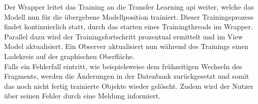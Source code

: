 \documentclass[oneside]{ausarbeitung}
\begin{document}
Der Wrapper leitet das Training an die Transfer Learning \ac{api} weiter, welche das Modell nun für die übergebene Modellposition trainiert.
Dieser Trainingsprozess findet kontinuierlich statt, durch das starten eines Trainingthreads im Wrapper.\\
Parallel dazu wird der Trainingsfortschritt prozentual ermittelt und im View Model aktualisiert. Ein Observer aktualisiert nun während des Trainings einen Ladekreis auf der graphischen Oberfläche.\\
Falls ein Fehlerfall eintritt, wie beispielsweise dem frühzeitigen Wechseln des Fragments, werden die Änderungen in der Datenbank zurückgesetzt und somit das noch nicht fertig trainierte Objekte wieder gelöscht. Zudem wird der Nutzer über seinen Fehler durch eine Meldung informiert.\\
\end{document}
